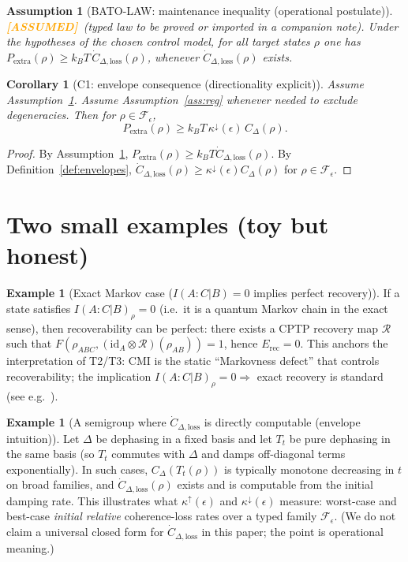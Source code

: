 \documentclass[11pt]{article}
\newtheorem{corollary}[theorem]{Corollary}
\newtheorem{assumption}[theorem]{Assumption}
\theoremstyle{definition}
\newtheorem{example}[theorem]{Example}
\theoremstyle{remark}
\newcommand{\ASSUMED}{\textcolor{orange}{\textbf{[ASSUMED]}}}
\newcommand{\Erec}{E_{\mathrm{rec}}}
\begin{document}
\begin{assumption}[BATO-LAW: maintenance inequality (operational
postulate)]
\label{ass:bato}
\ASSUMED\ (typed law to be proved or imported in a companion note).
Under the hypotheses of the chosen control model, for all target states
$\rho$ one has $P_{\mathrm{extra}}(\rho) \ge k_B T\,
\dot{C}_{\Delta,\mathrm{loss}}(\rho)$, whenever
$\dot{C}_{\Delta,\mathrm{loss}}(\rho)$ exists.
\end{assumption}

\begin{corollary}[C1: envelope consequence (directionality explicit)]
\label{cor:c1}
Assume Assumption~\ref{ass:bato}. Assume Assumption~\ref{ass:reg}
whenever needed to exclude degeneracies. Then for $\rho \in
\mathcal{F}_\epsilon$,
\[
P_{\mathrm{extra}}(\rho) \ge k_B T\, \kappa^{\downarrow}(\epsilon)\,
C_\Delta(\rho).
\]
\end{corollary}

\begin{proof}
By Assumption~\ref{ass:bato}, $P_{\mathrm{extra}}(\rho) \ge k_B T
\dot{C}_{\Delta,\mathrm{loss}}(\rho)$. By
Definition~\ref{def:envelopes}, $\dot{C}_{\Delta,\mathrm{loss}}(\rho)
\ge \kappa^{\downarrow}(\epsilon) C_\Delta(\rho)$ for $\rho \in
\mathcal{F}_\epsilon$.
\end{proof}

\section{Two small examples (toy but honest)}

\begin{example}[Exact Markov case ($I(A:C|B) = 0$ implies perfect
recovery)]
\label{ex:markov}
If a state satisfies $I(A : C | B)_\rho = 0$ (i.e.\ it is a quantum
Markov chain in the exact sense), then recoverability can be perfect:
there exists a CPTP recovery map $\mathcal{R}$ such that
$F(\rho_{ABC}, (\mathrm{id}_A \otimes \mathcal{R})(\rho_{AB})) = 1$,
hence $\Erec = 0$. This anchors the interpretation of T2/T3: CMI is the
static ``Markovness defect'' that controls recoverability; the
implication $I(A : C | B)_\rho = 0 \Rightarrow$ exact recovery is
standard (see e.g.\ \cite{HJPW}).
\end{example}

\begin{example}[A semigroup where $\dot{C}_{\Delta,\mathrm{loss}}$ is
directly computable (envelope intuition)]
\label{ex:dephasing}
Let $\Delta$ be dephasing in a fixed basis and let $T_t$ be pure
dephasing in the same basis (so $T_t$ commutes with $\Delta$ and damps
off-diagonal terms exponentially). In such cases, $C_\Delta(T_t(\rho))$
is typically monotone decreasing in $t$ on broad families, and
$\dot{C}_{\Delta,\mathrm{loss}}(\rho)$ exists and is computable from the
initial damping rate. This illustrates what $\kappa^{\uparrow}(\epsilon)$
and $\kappa^{\downarrow}(\epsilon)$ measure: worst-case and best-case
\emph{initial relative} coherence-loss rates over a typed family
$\mathcal{F}_\epsilon$. (We do not claim a universal closed form for
$\dot{C}_{\Delta,\mathrm{loss}}$ in this paper; the point is operational
meaning.)
\end{example}
\end{document}
